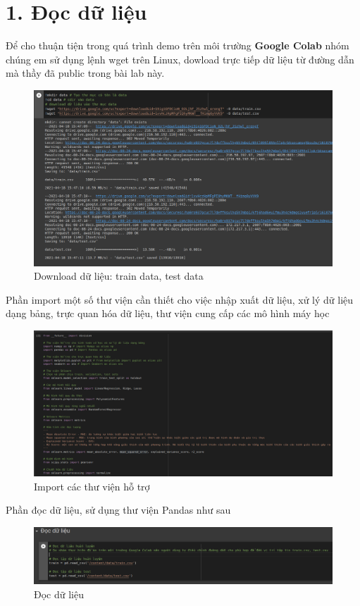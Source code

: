 \documentclass{article}
\begin{document}
	\section{1. Đọc dữ liệu}
	\qquad Để cho thuận tiện trong quá trình demo trên môi trường \textbf{Google Colab} nhóm chúng em sử dụng lệnh wget trên Linux, dowload trực tiếp dữ liệu từ đường dẫn mà thầy đã public trong bài lab này.
	\begin{figure}[H]
		\centering
		\includegraphics[width=1\textwidth]{images/download_data.png}
		\caption{Download dữ liệu: train data, test data}
		\label{fig:writing-thesis-dowload-data}
	\end{figure}
	
	Phần import một số thư viện cần thiết cho việc nhập xuất dữ liệu, xử lý dữ liệu dạng bảng, trực quan hóa dữ liệu, thư viện cung cấp các mô hình máy học
	\begin{figure}[H]
		\centering
		\includegraphics[width=1\textwidth]{images/import_section.png}
		\caption{Import các thư viện hỗ trợ}
		\label{fig:writing-thesis-import-section}
	\end{figure}
	
	Phần đọc dữ liệu, sử dụng thư viện Pandas như sau
	\begin{figure}[H]
		\centering
		\includegraphics[width=1\textwidth]{images/read_train_test.png}
		\caption{Đọc dữ liệu}
		\label{fig:writing-thesis-read-train-test-data}
	\end{figure}
	
\end{document}
